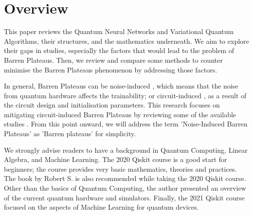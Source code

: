 \section{Overview}
This paper reviews the Quantum Neural Networks and Variational Quantum Algorithms, their structures, and the mathematics underneath. 
We aim to explore their gaps in studies, especially the factors that would lead to the problem of Barren Plateaus.
Then, we review and compare some methods to counter minimise the Barren Plateaus phenomenon by addressing those factors.

In general, Barren Plateaus can be noise-induced \cite{wangNoiseinducedBarrenPlateaus2021}, which means that the noise from quantum hardware affects the trainability; 
or circuit-induced \cite{mccleanBarrenPlateausQuantum2018}, as a result of the circuit design and initialisation parameters.
This research focuses on mitigating circuit-induced Barren Plateaus by reviewing some of the available studies \cite{pesahAbsenceBarrenPlateaus2021, cerezoCostFunctionDependent2021, skolikLayerwiseLearningQuantum2021}.
From this point onward, we will address the term 'Noise-Induced Barren Plateaus' as 'Barren plateaus' for simplicity.

We strongly advise readers to have a background in Quantum Computing, Linear Algebra, and Machine Learning. 
The 2020 Qiskit course \cite{2020QiskitGlobal} is a good start for beginners; the course provides very basic mathematics, theories and practices. 
The book \cite{sutorDancingQubitsHow2019} by Robert S. is also recommended while taking the 2020 Qiskit course. Other than the basics of Quantum Computing, the author presented an overview of the current quantum hardware and simulators.
Finally, the 2021 Qiskit course \cite{2021QiskitGlobal} focused on the aspects of Machine Learning for quantum devices.